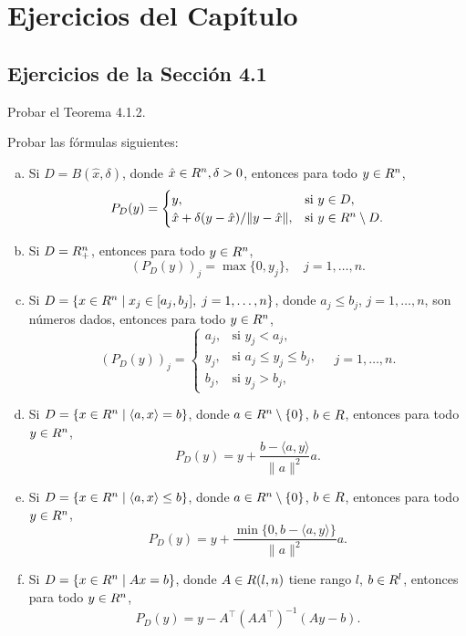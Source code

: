 
\section*{Ejercicios del Capítulo}

\subsection*{Ejercicios de la Sección 4.1}

\begin{exercise}\label{v2:ejer:4.1.1}
    Probar el Teorema 4.1.2.
\end{exercise}

\begin{exercise}\label{v2:ejer:4.1.2}
    Probar las fórmulas siguientes:
    \begin{enumerate}[(a)]
        \item Si $D = B(\hat{x}, \delta)$, donde $\hat{x} \in R^n, \delta > 0$, entonces para todo $y \in R^n$,
        \[
            P_D(y) = \begin{cases}
                y, & \text{si } y \in D, \\
                \hat{x} + \delta(y - \hat{x})/\|y - \hat{x}\|, & \text{si } y \in R^n \setminus D.
            \end{cases}
        \]
        \item Si $D = R^n_+$, entonces para todo $y \in R^n$,
        \[
            (P_D(y))_j = \max\{0, y_j\}, \quad j = 1, \dots, n.
        \]
        \item Si $D = \{x \in R^n \mid x_j \in [a_j, b_j], \; j = 1, \dots, n\}$, donde $a_j \le b_j$, $j = 1, \dots, n$, son números dados, entonces para todo $y \in R^n$,
        \[
            (P_D(y))_j = \begin{cases}
                a_j, & \text{si } y_j < a_j, \\
                y_j, & \text{si } a_j \le y_j \le b_j, \\
                b_j, & \text{si } y_j > b_j,
            \end{cases} \quad j = 1, \dots, n.
        \]
        \item Si $D = \{x \in R^n \mid \langle a, x \rangle = b\}$, donde $a \in R^n \setminus \{0\}$, $b \in R$, entonces para todo $y \in R^n$,
        \[
            P_D(y) = y + \frac{b - \langle a, y \rangle}{\|a\|^2}a.
        \]
        \item Si $D = \{x \in R^n \mid \langle a, x \rangle \le b\}$, donde $a \in R^n \setminus \{0\}$, $b \in R$, entonces para todo $y \in R^n$,
        \[
            P_D(y) = y + \frac{\min\{0, b - \langle a, y \rangle\}}{\|a\|^2}a.
        \]
        \item Si $D = \{x \in R^n \mid Ax = b\}$, donde $A \in R(l, n)$ tiene rango $l$, $b \in R^l$, entonces para todo $y \in R^n$,
        \[
            P_D(y) = y - A^\top(AA^\top)^{-1}(Ay - b).
        \]
    \end{enumerate}
\end{exercise}

